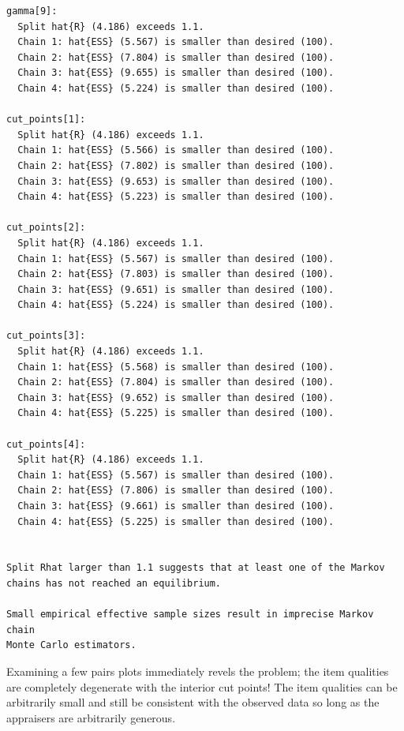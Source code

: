 \documentclass[
  letterpaper,
  DIV=11,
  numbers=noendperiod]{scrartcl}
\newenvironment{Shaded}{\begin{snugshade}}{\end{snugshade}}
\newcommand{\FunctionTok}[1]{\textcolor[rgb]{0.28,0.35,0.67}{#1}}
\newcommand{\NormalTok}[1]{\textcolor[rgb]{0.00,0.23,0.31}{#1}}
\newcommand{\SpecialCharTok}[1]{\textcolor[rgb]{0.37,0.37,0.37}{#1}}
\newcommand{\StringTok}[1]{\textcolor[rgb]{0.13,0.47,0.30}{#1}}
\begin{document}
\begin{verbatim}
gamma[9]:
  Split hat{R} (4.186) exceeds 1.1.
  Chain 1: hat{ESS} (5.567) is smaller than desired (100).
  Chain 2: hat{ESS} (7.804) is smaller than desired (100).
  Chain 3: hat{ESS} (9.655) is smaller than desired (100).
  Chain 4: hat{ESS} (5.224) is smaller than desired (100).

cut_points[1]:
  Split hat{R} (4.186) exceeds 1.1.
  Chain 1: hat{ESS} (5.566) is smaller than desired (100).
  Chain 2: hat{ESS} (7.802) is smaller than desired (100).
  Chain 3: hat{ESS} (9.653) is smaller than desired (100).
  Chain 4: hat{ESS} (5.223) is smaller than desired (100).

cut_points[2]:
  Split hat{R} (4.186) exceeds 1.1.
  Chain 1: hat{ESS} (5.567) is smaller than desired (100).
  Chain 2: hat{ESS} (7.803) is smaller than desired (100).
  Chain 3: hat{ESS} (9.651) is smaller than desired (100).
  Chain 4: hat{ESS} (5.224) is smaller than desired (100).

cut_points[3]:
  Split hat{R} (4.186) exceeds 1.1.
  Chain 1: hat{ESS} (5.568) is smaller than desired (100).
  Chain 2: hat{ESS} (7.804) is smaller than desired (100).
  Chain 3: hat{ESS} (9.652) is smaller than desired (100).
  Chain 4: hat{ESS} (5.225) is smaller than desired (100).

cut_points[4]:
  Split hat{R} (4.186) exceeds 1.1.
  Chain 1: hat{ESS} (5.567) is smaller than desired (100).
  Chain 2: hat{ESS} (7.806) is smaller than desired (100).
  Chain 3: hat{ESS} (9.661) is smaller than desired (100).
  Chain 4: hat{ESS} (5.225) is smaller than desired (100).


Split Rhat larger than 1.1 suggests that at least one of the Markov
chains has not reached an equilibrium.

Small empirical effective sample sizes result in imprecise Markov chain
Monte Carlo estimators.
\end{verbatim}

Examining a few pairs plots immediately revels the problem; the item
qualities are completely degenerate with the interior cut points! The
item qualities can be arbitrarily small and still be consistent with the
observed data so long as the appraisers are arbitrarily generous.

\begin{Shaded}
\end{Shaded}
\end{document}
